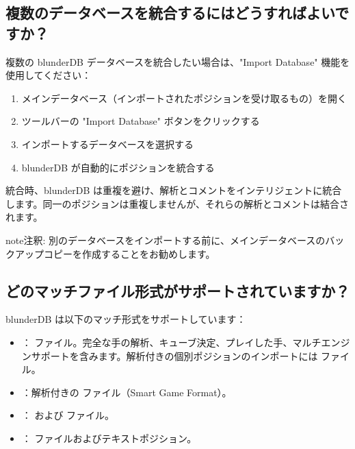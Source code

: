\documentclass[letterpaper,10pt,dvipdfmx]{sphinxmanual}
\begin{document}
\subsection{複数のデータベースを統合するにはどうすればよいですか？}
\label{\detokenize{faq:comment-fusionner-plusieurs-bases-de-donnees}}
\sphinxAtStartPar
複数の blunderDB データベースを統合したい場合は、"Import Database" 機能を使用してください：
\begin{enumerate}
%
\item {} 
\sphinxAtStartPar
メインデータベース（インポートされたポジションを受け取るもの）を開く

\item {} 
\sphinxAtStartPar
ツールバーの "Import Database" ボタンをクリックする

\item {} 
\sphinxAtStartPar
インポートするデータベースを選択する

\item {} 
\sphinxAtStartPar
blunderDB が自動的にポジションを統合する

\end{enumerate}

\sphinxAtStartPar
統合時、blunderDB は重複を避け、解析とコメントをインテリジェントに統合します。同一のポジションは重複しませんが、それらの解析とコメントは結合されます。

\begin{sphinxadmonition}{note}{注釈:}
\sphinxAtStartPar
別のデータベースをインポートする前に、メインデータベースのバックアップコピーを作成することをお勧めします。
\end{sphinxadmonition}


\subsection{どのマッチファイル形式がサポートされていますか？}
\label{\detokenize{faq:quels-formats-de-fichiers-de-match-sont-supportes}}
\sphinxAtStartPar
blunderDB は以下のマッチ形式をサポートしています：
\begin{itemize}
\item {} 
\sphinxAtStartPar
{}： ファイル。完全な手の解析、キューブ決定、プレイした手、マルチエンジンサポートを含みます。解析付きの個別ポジションのインポートには  ファイル。

\item {} 
\sphinxAtStartPar
{}：解析付きの  ファイル（Smart Game Format）。

\item {} 
\sphinxAtStartPar
{}： および  ファイル。

\item {} 
\sphinxAtStartPar
{}： ファイルおよびテキストポジション。

\end{itemize}
\end{document}
